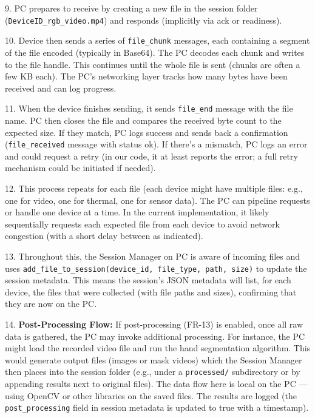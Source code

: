 9.  PC prepares to receive by creating a new file in the session folder
    (\texttt{DeviceID_rgb_video.mp4}) and responds (implicitly via ack or
    readiness).

10. Device then sends a series of \texttt{file\_chunk} messages, each containing
    a segment of the file encoded (typically in
    Base64)\cite{DeviceServer}.
    The PC decodes each chunk and writes to the file
    handle\cite{DeviceServer}.
    This continues until the whole file is sent (chunks are often a few
    KB each). The PC's networking layer tracks how many bytes have been
    received and can log
    progress\cite{DeviceServer}.

11. When the device finishes sending, it sends \texttt{file\_end} message with
    the file
    name\cite{DeviceServer}.
    PC then closes the file and compares the received byte count to the
    expected
    size\cite{DeviceServer}.
    If they match, PC logs success and sends back a confirmation
    (\texttt{file\_received} message with status
    ok)\cite{DeviceServer}.
    If there's a mismatch, PC logs an error and could request a retry
    (in our code, it at least reports the error; a full retry mechanism
    could be initiated if needed).

12. This process repeats for each file (each device might have multiple
    files: e.g., one for video, one for thermal, one for sensor data).
    The PC can pipeline requests or handle one device at a time. In the
    current implementation, it likely sequentially requests each
    expected file from each
    device\cite{DeviceServer}
    to avoid network congestion (with a short delay between as
    indicated\cite{DeviceServer}).

13. Throughout this, the Session Manager on PC is aware of incoming
    files and uses
    \texttt{add_file_to_session(device_id, file_type, path, size)} to update
    the session
    metadata\cite{SessionManager}\cite{SessionManager}.
    This means the session's JSON metadata will list, for each device,
    the files that were collected (with file paths and sizes),
    confirming that they are now on the PC.

14. \textbf{Post-Processing Flow:} If post-processing (FR-13) is enabled,
    once all raw data is gathered, the PC may invoke additional
    processing. For instance, the PC might load the recorded video file
    and run the hand segmentation algorithm. This would generate output
    files (images or mask videos) which the Session Manager then places
    into the session folder (e.g., under a \texttt{processed/} subdirectory or
    by appending results next to original files). The data flow here is
    local on the PC --- using OpenCV or other libraries on the saved
    files. The results are logged (the \texttt{post\_processing} field in
    session metadata is updated to true with a
    timestamp\cite{SessionManager}\cite{SessionManager}).

